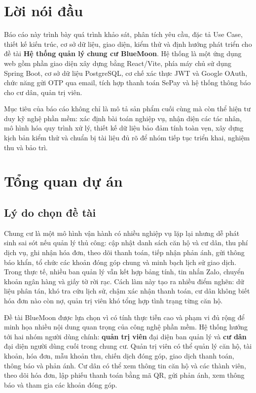 ﻿\documentclass[12pt,a4paper]{report}
\newcommand{\projectname}{BlueMoon}
\newcommand{\topic}{Hệ thống quản lý chung cư BlueMoon}
\begin{document}
\chapter*{Lời nói đầu}
Báo cáo này trình bày quá trình khảo sát, phân tích yêu cầu, đặc tả Use Case, thiết kế kiến trúc, cơ sở dữ liệu, giao diện, kiểm thử và định hướng phát triển cho đề tài \textbf{\topic}. Hệ thống là một ứng dụng web gồm phần giao diện xây dựng bằng React/Vite, phía máy chủ sử dụng Spring Boot, cơ sở dữ liệu PostgreSQL, cơ chế xác thực JWT và Google OAuth, chức năng gửi OTP qua email, tích hợp thanh toán SePay và hệ thống thông báo cho cư dân, quản trị viên.

Mục tiêu của báo cáo không chỉ là mô tả sản phẩm cuối cùng mà còn thể hiện tư duy kỹ nghệ phần mềm: xác định bài toán nghiệp vụ, nhận diện các tác nhân, mô hình hóa quy trình xử lý, thiết kế dữ liệu bảo đảm tính toàn vẹn, xây dựng kịch bản kiểm thử và chuẩn bị tài liệu đủ rõ để nhóm tiếp tục triển khai, nghiệm thu và bảo trì.

\chapter{Tổng quan dự án}

\section{Lý do chọn đề tài}
Chung cư là một mô hình vận hành có nhiều nghiệp vụ lặp lại nhưng dễ phát sinh sai sót nếu quản lý thủ công: cập nhật danh sách căn hộ và cư dân, thu phí dịch vụ, ghi nhận hóa đơn, theo dõi thanh toán, tiếp nhận phản ánh, gửi thông báo khẩn, tổ chức các khoản đóng góp chung và minh bạch lịch sử giao dịch. Trong thực tế, nhiều ban quản lý vẫn kết hợp bảng tính, tin nhắn Zalo, chuyển khoản ngân hàng và giấy tờ rời rạc. Cách làm này tạo ra nhiều điểm nghẽn: dữ liệu phân tán, khó tra cứu lịch sử, chậm xác nhận thanh toán, cư dân không biết hóa đơn nào còn nợ, quản trị viên khó tổng hợp tình trạng từng căn hộ.

Đề tài \projectname{} được lựa chọn vì có tính thực tiễn cao và phạm vi đủ rộng để minh họa nhiều nội dung quan trọng của công nghệ phần mềm. Hệ thống hướng tới hai nhóm người dùng chính: \textbf{quản trị viên} đại diện ban quản lý và \textbf{cư dân} đại diện người dùng cuối trong chung cư. Quản trị viên có thể quản lý căn hộ, tài khoản, hóa đơn, mẫu khoản thu, chiến dịch đóng góp, giao dịch thanh toán, thông báo và phản ánh. Cư dân có thể xem thông tin căn hộ và các thành viên, theo dõi hóa đơn, lập phiếu thanh toán bằng mã QR, gửi phản ánh, xem thông báo và tham gia các khoản đóng góp.
\end{document}
